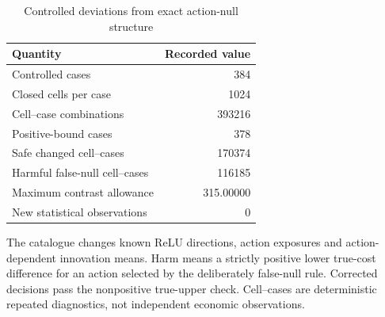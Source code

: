 \begin{table}[htbp]
\centering
\caption{Controlled deviations from exact action-null structure}\label{tab:misspecification54}
{\small\setlength{\tabcolsep}{4pt}
\begin{tabular}{lr}
\hline
Quantity & Recorded value \\
\hline
Controlled cases & 384 \\
Closed cells per case & 1024 \\
Cell--case combinations & 393216 \\
Positive-bound cases & 378 \\
Safe changed cell--cases & 170374 \\
Harmful false-null cell--cases & 116185 \\
Maximum contrast allowance & 315.00000 \\
New statistical observations & 0 \\
\hline
\end{tabular}}
\par\smallskip
{\footnotesize The catalogue changes known ReLU directions, action exposures and action-dependent innovation means. Harm means a strictly positive lower true-cost difference for an action selected by the deliberately false-null rule. Corrected decisions pass the nonpositive true-upper check. Cell--cases are deterministic repeated diagnostics, not independent economic observations.}
\end{table}
